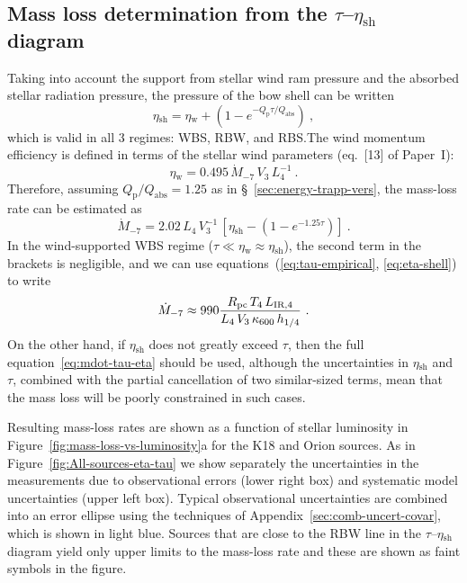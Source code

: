\documentclass[useAMS, usenatbib, a4paper]{mnras}
\newcommand\Qp{\ensuremath{Q_{\text{p}}}}
\newcommand{\wind}{\ensuremath{_{\text{w}}}}
\newcommand\shell{\ensuremath{_{\text{sh}}}}
\begin{document}
\subsection{Mass loss determination from the \boldmath \(\tau\)--\(\eta\shell\) diagram}
\label{sec:mass-loss-determ}

Taking into account the support from stellar wind ram pressure and the
absorbed stellar radiation pressure, the pressure of the bow shell can
be written
\begin{equation}
  \label{eq:eta-shell-components}
  \eta\shell = \eta\wind +  \left(  1 - e^{-\Qp \tau / Q_{\text{abs}}}\right) \ ,
\end{equation}
which is valid in all 3 regimes: WBS, RBW, and RBS.\@ The wind
momentum efficiency is defined in terms of the stellar wind parameters
(eq.~[13] of Paper~I):
\begin{equation}
  \label{eq:wind-eta-typical}
  \eta\wind = \num{0.495} \,\dot{M}_{-7} \,V_3  \,L_4^{-1} \ .
\end{equation}
Therefore, assuming \(\Qp/Q_{\text{abs}} = 1.25\) as in
\S~\ref{sec:energy-trapp-vers}, the mass-loss rate can be estimated as
\begin{equation}
  \label{eq:mdot-tau-eta}
  \dot{M}_{-7} = 2.02 \, L_4 \, V_3^{-1} \,
  \left[ \eta\shell - \left(  1 - e^{-1.25 \tau} \right) \right]  \ .
\end{equation}
In the wind-supported WBS regime
(\(\tau \ll \eta\wind \approx \eta\shell\)), the second term in the brackets is
negligible, and we can use equations~(\ref{eq:tau-empirical},
\ref{eq:eta-shell}) to write
\begin{equation}
  \label{eq:mdot-eta-wbs}
  \dot{M}_{-7} \approx 990 \frac{R_{\text{pc}} \, T_4 \, L_{\text{IR},4}}
  {L_4 \, V_3 \, \kappa_{600} \, h_{1/4}} \ .
\end{equation}
On the other hand, if \(\eta\shell\) does not greatly exceed \(\tau\), then
the full equation~\eqref{eq:mdot-tau-eta} should be used, although the
uncertainties in \(\eta\shell\) and \(\tau\), combined with the partial
cancellation of two similar-sized terms, mean that the mass loss will
be poorly constrained in such cases.

Resulting mass-loss rates are shown as a function of stellar
luminosity in Figure~\ref{fig:mass-loss-vs-luminosity}a for the K18
and Orion sources.  As in Figure~\ref{fig:All-sources-eta-tau} we show
separately the uncertainties in the measurements due to observational
errors (lower right box) and systematic model uncertainties (upper
left box).  Typical observational uncertainties are combined into an
error ellipse using the techniques of
Appendix~\ref{sec:comb-uncert-covar}, which is shown in light blue.
Sources that are close to the RBW line in the \(\tau\)--\(\eta\shell\)
diagram yield only upper limits to the mass-loss rate and these are
shown as faint symbols in the figure.
\end{document}
